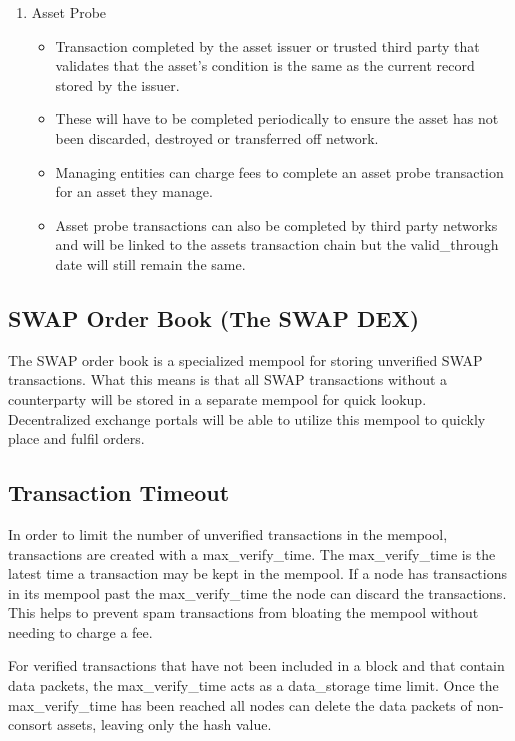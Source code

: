 \documentclass[12pt]{article}
\begin{document}
\begin{enumerate}
	\item Asset Probe
		\begin{itemize}
			\item{Transaction completed by the asset issuer or 
				trusted third party that validates that the asset's condition 
				is the same as the current record stored by the issuer.}
			\item{These will have to be 
				completed periodically to ensure the asset has not been 
				discarded, destroyed or transferred off network.}
			\item{Managing 
				entities can charge fees to complete an asset probe transaction 
				for an asset they manage.}
			\item{Asset probe transactions can also 
				be completed by third party networks and will be linked to 
				the assets transaction chain but the valid\_through date 
				will still remain the same.}
		\end{itemize}
\end{enumerate}


\subsection{SWAP Order Book (The SWAP DEX)}
The SWAP order book is a specialized mempool for storing unverified SWAP transactions.  What this means is that
all SWAP transactions without a counterparty will be stored in a separate mempool for quick lookup. 
Decentralized exchange portals will be able to utilize this mempool to quickly place and fulfil orders.


\subsection{Transaction Timeout}


In order to limit the number of unverified transactions in the mempool, 
transactions are created with a max\_verify\_time.  The max\_verify\_time
is the latest time a transaction may be kept in the mempool.  If a node has 
transactions in its mempool past the max\_verify\_time the node can discard 
the transactions.  This helps to prevent spam transactions from bloating the 
mempool without needing to charge a fee.

For verified transactions 
that have not been included in a block and that contain data packets, the max\_verify\_time
acts as a data\_storage time limit.  Once the max\_verify\_time has been reached all nodes 
can delete the data packets of non-consort assets, leaving only the hash value.
\end{document}
